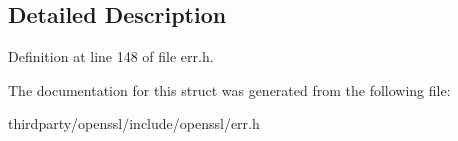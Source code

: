 \subsection{Detailed Description}


Definition at line 148 of file err.\+h.



The documentation for this struct was generated from the following file\+:\begin{DoxyCompactItemize}
\item 
thirdparty/openssl/include/openssl/err.\+h\end{DoxyCompactItemize}
